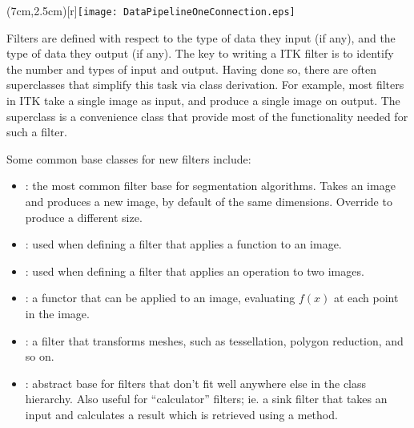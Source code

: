 \parpic(7cm,2.5cm)[r]{\texttt{[image: DataPipelineOneConnection.eps]}}


Filters are defined with respect to the type of data they input (if
any), and the type of data they output (if any). The key to writing a
ITK filter is to identify the number and types of input and
output. Having done so, there are often superclasses that simplify
this task via class derivation. For example, most filters in ITK take
a single image as input, and produce a single image on output. The
superclass  is a convenience class that
provide most of the functionality needed for such a filter.

Some common base classes for new filters include:

\begin{itemize}

  \item {}: the most common filter base for
    segmentation algorithms.  Takes an image and produces a new image, by
    default of the same dimensions.  Override
     to produce a different size.

  \item {}: used when defining a filter that
  applies a function to an image.

  \item {}: used when defining a filter that
  applies an operation to two images.

  \item {}: a functor that can be applied to an image,
  evaluating $f(x) $ at each point in the image.

  \item {}: a filter that transforms meshes, such as
  tessellation, polygon reduction, and so on.

  \item {}: abstract base for filters that don't fit well
  anywhere else in the class hierarchy.  Also useful for ``calculator''
  filters; ie. a sink filter that takes an input and calculates a result
  which is retrieved using a  method.

\end{itemize}

